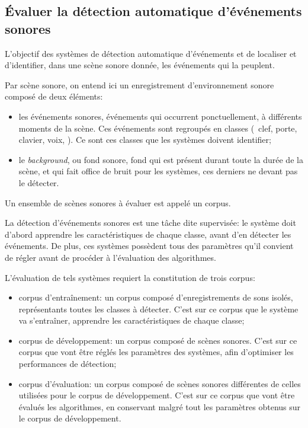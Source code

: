 \subsection{Évaluer la détection automatique d'événements sonores}

L'objectif des systèmes de détection automatique d'événements et de localiser et d'identifier, dans une scène sonore donnée, les événements qui la peuplent.

Par scène sonore, on entend ici un enregistrement d'environnement sonore composé de deux éléments:

\begin{itemize}
\item les événements sonores, événements qui occurrent ponctuellement, à différents moments de la scène. Ces événements sont regroupés en classes (\eg~clef, porte, clavier, voix, \etc). Ce sont ces classes que les systèmes doivent identifier;
\item le \emph{background}, ou fond sonore, fond qui est présent durant toute la durée de la scène, et qui fait office de bruit pour les systèmes, ces derniers ne devant pas le détecter.
\end{itemize}

Un ensemble de scènes sonores à évaluer est appelé un corpus.

La détection d'événements sonores est une tâche dite supervisée: le système doit d'abord apprendre les caractéristiques de chaque classe, avant d'en détecter les événements. De plus, ces systèmes possèdent tous des paramètres qu'il convient de régler avant de procéder à l'évaluation des algorithmes.

L'évaluation de tels systèmes requiert la constitution de trois corpus:

\begin{itemize}
\item corpus d'entraînement: un corpus composé d'enregistrements de sons isolés, représentants toutes les classes à détecter. C'est sur ce corpus que le système va s'entraîner, apprendre les caractéristiques de chaque classe;
\item corpus de développement: un corpus composé de scènes sonores. C'est sur ce corpus que vont être réglés les paramètres des systèmes, afin d'optimiser les performances de détection;
\item corpus d'évaluation: un corpus composé de scènes sonores différentes de celles utilisées pour le corpus de développement. C'est sur ce corpus que vont être évalués les algorithmes, en conservant malgré tout les paramètres obtenus sur le corpus de développement.
\end{itemize}


